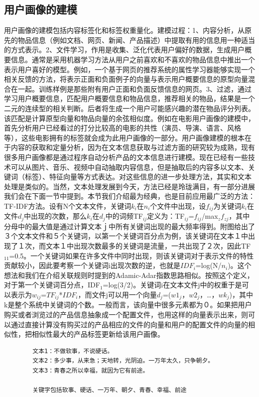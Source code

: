 		\subsection{用户画像的建模}
		用户画像的建模包括内容标签化和标签权重量化。建模过程：1、内容分析，从原先的物品信息（例如文档、网页、新闻、产品描述）中提取有用的信息用一种适当的方式表示。2、文件学习，作用是收集、泛化代表用户偏好的数据，生成用户概要信息。通常是采用机器学习方法从用户之前喜欢和不喜欢的物品信息中推出一个表示用户喜好的模型。例如，一个基于网页的推荐系统的属性学习器能够实现一个相关反馈的方法，将表示正面和负面例子的向量与表示用户概要信息的原型向量混合在一起。训练样例是那些附有用户正面和负面反馈信息的网页。3、过滤，通过学习用户概要信息，匹配用户概要信息和物品信息，推荐相关的物品，结果是一个二元的连续型的相关判断。后者将生成一个用户可能感兴趣的潜在物品评分列表。该匹配是计算原型向量和物品向量的余弦相似度。例如在电影用户画像的建模中，首先分析用户已经看过的打分比较高的电影的共性（演员、导演、语言、风格等），这些电影拥有的标签就会成为此用户画像的一部分。用户画像建模的根本在于内容的获取和定量分析，因为在文本信息获取与过滤方面的研究较为成熟，现有很多用户画像都是通过程序自动分析产品的文本信息进行建模。现在已经有一些技术可以从图片、音乐、视频中自动抽取内容信息，但是抽取后的内容多以文本、关键词（标签）、特征向量等方式表达。对这些信息的进一步处理方法，其实和文本处理是类似的。当然，文本处理发展到今天，方法已经是玲珑满目，有一部分进展我们会在下面一节中提到。本节我们介绍最为经典，也是目前应用最广泛的方法：TF-IDF方法。设有N个文本文件，关键词$k_{i}$在$n_{i}$个文件中出现，设$f_{ij}$为关键词$k_i$在文件$d_j$中出现的次数，那么$k_i$在$d_j$中的词频TF$_{ij}$定义为：TF$_{ij}$=$f_{ij}$/max$_zf_{zj}$，其中分母中的最大值是通过计算文本ｊ中所有关键词出现的最大频率得到。附图给出了３个文本文件和５个关键词，以第一个关键词百分点为例，该关键词在文本１中出现了１次，而文本１中出现次数最多的关键词是流量，一共出现了２次，因此TF$_{11}$=0.5。一个关键词如果在许多文件中同时出现，则该关键词对于表示文件的特性贡献较小，因此要考察一个关键词i出现次数的逆，也就是$IDF_{i}$=log(N/$n_{i}$)。这个想法和我们在介绍关联规则时提到的Adamic-Adar指数思路相似。按照这个定义，对于第一个关键词百分点，IDF$_1$=log(3/2)。关键词i在文本文件j中的权重于是可以表示为$w_{ij}$=$TF_{ij}$*$IDF_{i}$，而文件j可以用一个向量$d_{j}$=($w1_{j}$，$w2_{j}$，…，$wk_{j}$)，其中k是整个系统中关键词的个数。一般而言，该向量中很多元素都为０。如果把用户购买或者浏览过的产品信息抽象成一个配置文件，也用这样的向量表示出来，则可以通过直接计算没有购买过的产品相应的文件的向量和用户的配置文件的向量的相似性，把相似性最大的产品标签更新给该用户画像。
		\begin{lstlisting}
		文本1：不做软事，不说硬话。
		文本2：多少事，从来急；天地转，光阴迫。一万年太久，只争朝夕。
		文本3：青春之所以幸福，就因为它有前途。

		关键字包括软事、硬话、一万年、朝夕、青春、幸福、前途
		\end{lstlisting}

